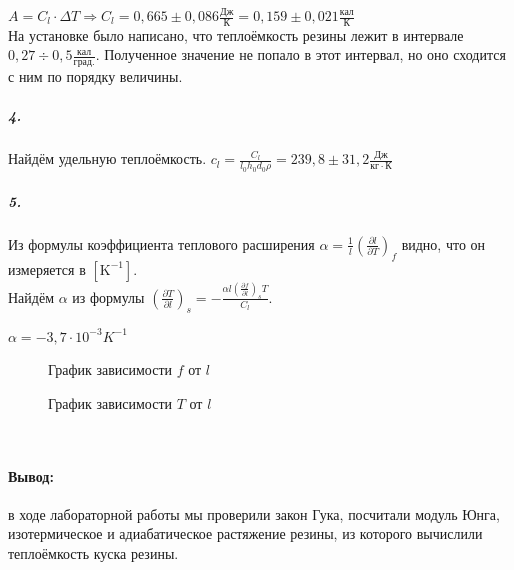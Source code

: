 \documentclass[a4paper,12pt]{article}
\begin{document}
$A=C_l\cdot \Delta T\Rightarrow C_l = 0,665\pm 0,086 \frac{Дж}{К} = 0,159\pm 0,021\frac{кал}{К}$\\
На установке было написано, что теплоёмкость резины лежит в интервале $0,27\div0,5 \frac{кал}{град.}$. Полученное значение не попало в этот интервал, но оно сходится с ним по порядку величины.
\subparagraph{4.}Найдём удельную теплоёмкость.
$c_l = \frac{C_l}{l_0 h_0 d_0 \rho}=239,8\pm 31,2 \frac{Дж}{кг\cdot К}$\newpage
\subparagraph{5.}Из формулы коэффициента теплового расширения $\alpha = \frac{1}{l}(\frac{\partial l}{\partial T})_f$ видно, что он измеряется в $[\text{K}^{-1}]$. \\
Найдём $\alpha$ из формулы $(\frac{\partial T}{\partial l})_s = -\frac{\alpha l(\frac{\partial f}{\partial l})_s T}{C_l}$.
\begin{center}
    $\alpha = -3,7\cdot 10^{-3} K^{-1}$\\
\end{center}
\begin{figure}[h]
	\caption{График зависимости $f$ от $l$}
	\label{ris:ustanovka}
\end{figure}
\begin{figure}[h]
	\caption{График зависимости $T$ от $l$}
	\label{ris:ustanovka}
\end{figure}\\
\newpage
\paragraph{Вывод:}в ходе лабораторной работы мы проверили закон Гука, посчитали модуль Юнга, изотермическое и адиабатическое растяжение резины, из которого вычислили теплоёмкость куска резины.
\end{document}
